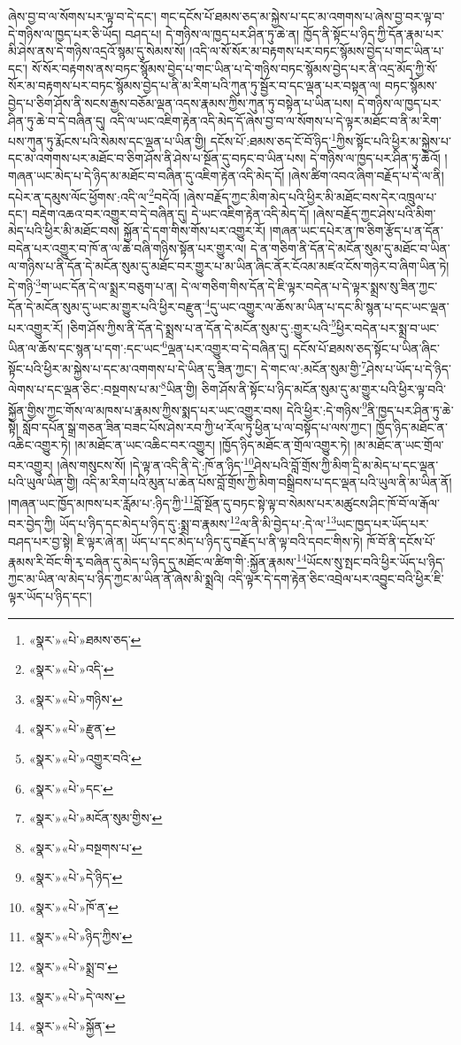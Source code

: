 ཞེས་བྱ་བ་ལ་སོགས་པར་ལྟ་བ་དེ་དང་། གང་དངོས་པོ་ཐམས་ཅད་མ་སྐྱེས་པ་དང་མ་འགགས་པ་ཞེས་བྱ་བར་ལྟ་བ་དེ་གཉིས་ལ་ཁྱད་པར་ཅི་ཡོད། བཤད་པ། དེ་གཉིས་ལ་ཁྱད་པར་ཤིན་ཏུ་ཆེ་ན། ཁྱོད་ནི་སྟོང་པ་ཉིད་ཀྱི་དོན་རྣམ་པར་མི་ཤེས་ནས་དེ་གཉིས་འདྲའོ་སྙམ་དུ་སེམས་སོ། །འདི་ལ་སོ་སོར་མ་བརྟགས་པར་བཏང་སྙོམས་བྱེད་པ་གང་ཡིན་པ་དང་། སོ་སོར་བརྟགས་ནས་བཏང་སྙོམས་བྱེད་པ་གང་ཡིན་པ་དེ་གཉིས་བཏང་སྙོམས་བྱེད་པར་ནི་འདྲ་མོད་ཀྱི་སོ་སོར་མ་བརྟགས་པར་བཏང་སྙོམས་བྱེད་པ་ནི་མ་རིག་པའི་ཀུན་ཏུ་སྦྱོར་བ་དང་ལྡན་པར་བསྟན་ལ། བཏང་སྙོམས་བྱེད་པ་ཅིག་ཤོས་ནི་སངས་རྒྱས་བཅོམ་ལྡན་འདས་རྣམས་ཀྱིས་ཀུན་ཏུ་བསྟེན་པ་ཡིན་པས། དེ་གཉིས་ལ་ཁྱད་པར་ཤིན་ཏུ་ཆེ་བ་དེ་བཞིན་དུ། འདི་ལ་ཡང་འཇིག་རྟེན་འདི་མེད་དོ་ཞེས་བྱ་བ་ལ་སོགས་པ་དེ་ལྟར་མཐོང་བ་ནི་མ་རིག་པས་ཀུན་ཏུ་རྨོངས་པའི་སེམས་དང་ལྡན་པ་ཡིན་གྱི། དངོས་པོ་:ཐམས་ཅད་ངོ་བོ་ཉིད་\footnote{«སྣར་»«པེ་»ཐམས་ཅད་}ཀྱིས་སྟོང་པའི་ཕྱིར་མ་སྐྱེས་པ་དང་མ་འགགས་པར་མཐོང་བ་ཅིག་ཤོས་ནི་ཤེས་པ་སྔོན་དུ་བཏང་བ་ཡིན་པས། དེ་གཉིས་ལ་ཁྱད་པར་ཤིན་ཏུ་ཆེའོ། །གཞན་ཡང་མེད་པ་དེ་ཉིད་མ་མཐོང་བ་བཞིན་དུ་འཇིག་རྟེན་འདི་མེད་དོ། །ཞེས་ཚིག་འབའ་ཞིག་བརྗོད་པ་དེ་ལ་ནི། དཔེར་ན་དམུས་ལོང་ཕྱོགས་:འདི་ལ་\footnote{«སྣར་»«པེ་»འདི་}བདེའོ། །ཞེས་བརྗོད་ཀྱང་མིག་མེད་པའི་ཕྱིར་མི་མཐོང་བས་དེར་འཁྲུལ་པ་དང་། བརྡེག་འཆའ་བར་འགྱུར་བ་དེ་བཞིན་དུ། དེ་ཡང་འཇིག་རྟེན་འདི་མེད་དོ། །ཞེས་བརྗོད་ཀྱང་ཤེས་པའི་མིག་མེད་པའི་ཕྱིར་མི་མཐོང་བས། སྐྱོན་དེ་དག་གིས་གོས་པར་འགྱུར་རོ། །གཞན་ཡང་དཔེར་ན་ཁ་ཅིག་རྩོད་པ་ན་དོན་བདེན་པར་འགྱུར་བ་ཁོ་ན་ལ་ཆེ་བཞི་གཉིས་སྟོན་པར་གྱུར་ལ། དེ་ན་གཅིག་ནི་དོན་དེ་མངོན་སུམ་དུ་མཐོང་བ་ཡིན་ལ་གཉིས་པ་ནི་དོན་དེ་མངོན་སུམ་དུ་མཐོང་བར་གྱུར་པ་མ་ཡིན་ཞིང་ནོར་ངོའམ་མཛའ་ངོས་གཉེར་བ་ཞིག་ཡིན་ཏེ། དེ་གཉི་\footnote{«སྣར་»«པེ་»གཉིས་}ག་ཡང་དོན་དེ་ལ་སྨྲར་བཅུག་པ་ན། དེ་ལ་གཅིག་གིས་དོན་དེ་ཇི་ལྟར་བདེན་པ་དེ་ལྟར་སྨྲས་སུ་ཟིན་ཀྱང་དོན་དེ་མངོན་སུམ་དུ་ཡང་མ་གྱུར་པའི་ཕྱིར་བརྫུན་\footnote{«སྣར་»«པེ་»རྫུན་}དུ་ཡང་འགྱུར་ལ་ཆོས་མ་ཡིན་པ་དང་མི་སྙན་པ་དང་ཡང་ལྡན་པར་འགྱུར་རོ། །ཅིག་ཤོས་ཀྱིས་ནི་དོན་དེ་སྨྲས་པ་ན་དོན་དེ་མངོན་སུམ་དུ་:གྱུར་པའི་\footnote{«སྣར་»«པེ་»འགྱུར་བའི་}ཕྱིར་བདེན་པར་སྨྲ་བ་ཡང་ཡིན་ལ་ཆོས་དང་སྙན་པ་དག་:དང་ཡང་\footnote{«སྣར་»«པེ་»དང་}ལྡན་པར་འགྱུར་བ་དེ་བཞིན་དུ། དངོས་པོ་ཐམས་ཅད་སྟོང་པ་ཡིན་ཞིང་སྟོང་པའི་ཕྱིར་མ་སྐྱེས་པ་དང་མ་འགགས་པ་དེ་ཡིན་དུ་ཟིན་ཀྱང་། དེ་གང་ལ་:མངོན་སུམ་གྱི་\footnote{«སྣར་»«པེ་»མངོན་སུམ་གྱིས་}ཤེས་པ་ཡོད་པ་དེ་ཉིད་ལེགས་པ་དང་ལྡན་ཅིང་:བསྔགས་པ་མ་\footnote{«སྣར་»«པེ་»བསྔགས་པ་}ཡིན་གྱི། ཅིག་ཤོས་ནི་སྟོང་པ་ཉིད་མངོན་སུམ་དུ་མ་གྱུར་པའི་ཕྱིར་ལྟ་བའི་སྐྱོན་གྱིས་ཀྱང་གོས་ལ་མཁས་པ་རྣམས་ཀྱིས་སྨད་པར་ཡང་འགྱུར་བས། དེའི་ཕྱིར་:དེ་གཉིས་\footnote{«སྣར་»«པེ་»དེ་ཉིད་}ནི་ཁྱད་པར་ཤིན་ཏུ་ཆེ་སྟེ། སློབ་དཔོན་སྒྲ་གཅན་ཟིན་བཟང་པོས་ཤེས་རབ་ཀྱི་ཕ་རོལ་ཏུ་ཕྱིན་པ་ལ་བསྟོད་པ་ལས་ཀྱང་། ཁྱོད་ཉིད་མཐོང་ན་འཆིང་འགྱུར་ཏེ། །མ་མཐོང་ན་ཡང་འཆིང་བར་འགྱུར། །ཁྱོད་ཉིད་མཐོང་ན་གྲོལ་འགྱུར་ཏེ། །མ་མཐོང་ན་ཡང་གྲོལ་བར་འགྱུར། །ཞེས་གསུངས་སོ། །དེ་ལྟ་ན་འདི་ནི་དེ་:ཁོ་ན་ཉིད་\footnote{«སྣར་»«པེ་»ཁོ་ན་}ཤེས་པའི་བློ་གྲོས་ཀྱི་མིག་དྲི་མ་མེད་པ་དང་ལྡན་པའི་ཡུལ་ཡིན་གྱི། འདི་མ་རིག་པའི་མུན་པ་ཆེན་པོས་བློ་གྲོས་ཀྱི་མིག་བསྒྲིབས་པ་དང་ལྡན་པའི་ཡུལ་ནི་མ་ཡིན་ནོ། །གཞན་ཡང་ཁྱོད་མཁས་པར་རློམ་པ་:ཉིད་ཀྱི་\footnote{«སྣར་»«པེ་»ཉིད་ཀྱིས་}བློ་སྔོན་དུ་བཏང་སྟེ་ལྟ་བ་སེམས་པར་མཚུངས་ཤིང་ཁོ་བོ་ལ་རྒོལ་བར་བྱེད་ཀྱི། ཡོད་པ་ཉིད་དང་མེད་པ་ཉིད་དུ་:སྨྲ་བ་རྣམས་\footnote{«སྣར་»«པེ་»སྨྲ་བ་}ལ་ནི་མི་བྱེད་པ་:དེ་ལ་\footnote{«སྣར་»«པེ་»དེ་ལས་}ཡང་ཁྱད་པར་ཡོད་པར་བཤད་པར་བྱ་སྟེ། ཇི་ལྟར་ཞེ་ན། ཡོད་པ་དང་མེད་པ་ཉིད་དུ་བརྗོད་པ་ནི་ལྟ་བའི་དབང་གིས་ཏེ། ཁོ་བོ་ནི་དངོས་པོ་རྣམས་རི་བོང་གི་རྭ་བཞིན་དུ་མེད་པ་ཉིད་དུ་མཐོང་ལ་ཚིག་གི་:སྐྱོན་རྣམས་\footnote{«སྣར་»«པེ་»སྐྱོན་}ཡོངས་སུ་སྤང་བའི་ཕྱིར་ཡོད་པ་ཉིད་ཀྱང་མ་ཡིན་ལ་མེད་པ་ཉིད་ཀྱང་མ་ཡིན་ནོ་ཞེས་མི་སྨྲའི། འདི་ལྟར་དེ་དག་རྟེན་ཅིང་འབྲེལ་པར་འབྱུང་བའི་ཕྱིར་ཇི་ལྟར་ཡོད་པ་ཉིད་དང་། 